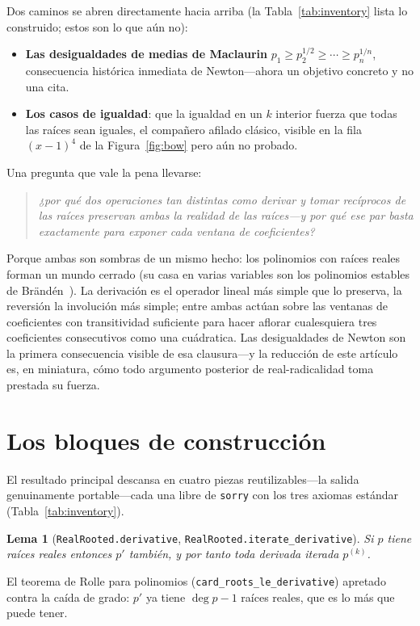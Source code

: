 \documentclass[11pt]{article}
\newtheorem{lemma}{Lema}
\newcommand{\lean}[1]{\texttt{#1}}
\begin{document}
Dos caminos se abren directamente hacia arriba (la Tabla~\ref{tab:inventory} lista lo construido;
estos son lo que a\'un no):
\begin{itemize}\itemsep1pt
\item \textbf{Las desigualdades de medias de Maclaurin} $p_1\ge p_2^{1/2}\ge\cdots\ge p_n^{1/n}$,
  consecuencia hist\'orica inmediata de Newton---ahora un objetivo concreto y no una cita.
\item \textbf{Los casos de igualdad}: que la igualdad en un $k$ interior fuerza que todas las
  ra\'ices sean iguales, el compa\~nero afilado cl\'asico, visible en la fila $(x-1)^4$ de la
  Figura~\ref{fig:bow} pero a\'un no probado.
\end{itemize}

Una pregunta que vale la pena llevarse:
\begin{quote}\itshape
  ¿por qu\'e dos operaciones tan distintas como \emph{derivar} y \emph{tomar rec\'iprocos de las
  ra\'ices} preservan ambas la realidad de las ra\'ices---y por qu\'e ese par basta exactamente para
  exponer cada ventana de coeficientes?
\end{quote}
Porque ambas son sombras de un mismo hecho: los polinomios con ra\'ices reales forman un mundo
cerrado (su casa en varias variables son los polinomios estables de Br\"and\'en~\cite{Branden2015}).
La derivaci\'on es el operador lineal m\'as simple que lo preserva, la reversi\'on la involuci\'on
m\'as simple; entre ambas act\'uan sobre las ventanas de coeficientes con transitividad suficiente
para hacer aflorar cualesquiera tres coeficientes consecutivos como una cu\'adratica. Las
desigualdades de Newton son la primera consecuencia visible de esa clausura---y la reducci\'on de
este art\'iculo es, en miniatura, c\'omo todo argumento posterior de real-radicalidad toma prestada
su fuerza.

\section{Los bloques de construcci\'on}\label{sec:blocks}

El resultado principal descansa en cuatro piezas reutilizables---la salida genuinamente
portable---cada una libre de \lean{sorry} con los tres axiomas est\'andar
(Tabla~\ref{tab:inventory}).

\begin{lemma}[\lean{RealRooted.derivative}, \lean{RealRooted.iterate\_derivative}]
Si $p$ tiene ra\'ices reales entonces $p'$ tambi\'en, y por tanto toda derivada iterada $p^{(k)}$.
\end{lemma}
El teorema de Rolle para polinomios (\lean{card\_roots\_le\_derivative}) apretado contra la ca\'ida
de grado: $p'$ ya tiene $\deg p-1$ ra\'ices reales, que es lo m\'as que puede tener.
\end{document}
